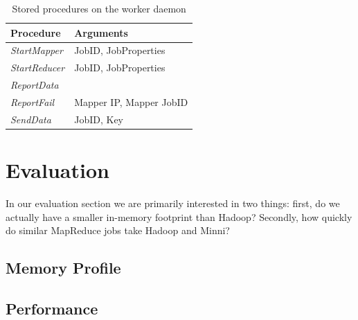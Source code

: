 \documentclass[10pt,letter,final,article,twocolumn]{article} %
\newcommand{\rpc}[1]{\emph{#1}}
\begin{document}
\begin{table}[htdp]
\caption{Stored procedures on the worker daemon}
\begin{center}
\begin{tabular}{|l|l|}\hline
\textbf{Procedure} & \textbf{Arguments}\\\hline
\rpc{StartMapper} & JobID, JobProperties\\
\rpc{StartReducer} & JobID,  JobProperties\\
\rpc{ReportData} & \\
\rpc{ReportFail} & Mapper IP, Mapper JobID\\
\rpc{SendData} & JobID, Key\\
\end{tabular}
\end{center}
\label{tab:worker_rpc}
\end{table}%



\section{Evaluation}
In our evaluation section we are primarily interested in two things: first, do we actually have a smaller in-memory footprint than Hadoop? Secondly, how quickly do similar MapReduce jobs take Hadoop and Minni?
\subsection{Memory Profile}
\subsection{Performance}




\end{document}
